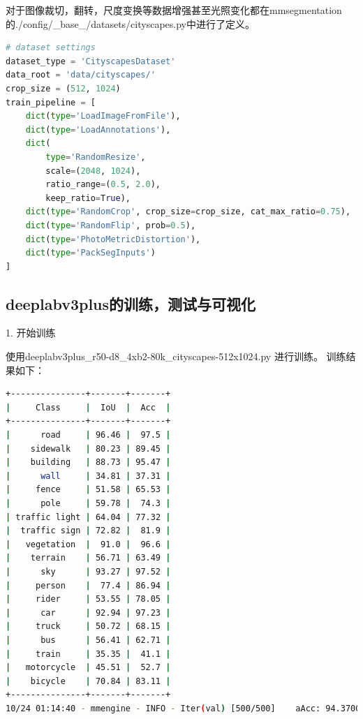 \documentclass[12pt]{ctexart}
\begin{document}
对于图像裁切，翻转，尺度变换等数据增强甚至光照变化都在mmsegmentation的./config/\_base\_/datasets/cityscapes.py中进行了定义。
\begin{lstlisting}[language=Python]
# dataset settings
dataset_type = 'CityscapesDataset'
data_root = 'data/cityscapes/'
crop_size = (512, 1024)
train_pipeline = [
    dict(type='LoadImageFromFile'),
    dict(type='LoadAnnotations'),
    dict(
        type='RandomResize',
        scale=(2048, 1024),
        ratio_range=(0.5, 2.0),
        keep_ratio=True),
    dict(type='RandomCrop', crop_size=crop_size, cat_max_ratio=0.75),
    dict(type='RandomFlip', prob=0.5),
    dict(type='PhotoMetricDistortion'),
    dict(type='PackSegInputs')
]
\end{lstlisting}


\subsection{deeplabv3plus的训练，测试与可视化}
1. 开始训练

使用deeplabv3plus\_r50-d8\_4xb2-80k\_cityscapes-512x1024.py
进行训练。
训练结果如下：
\begin{lstlisting}[language=bash]
+---------------+-------+-------+
|     Class     |  IoU  |  Acc  |
+---------------+-------+-------+
|      road     | 96.46 |  97.5 |
|    sidewalk   | 80.23 | 89.45 |
|    building   | 88.73 | 95.47 |
|      wall     | 34.81 | 37.31 |
|     fence     | 51.58 | 65.53 |
|      pole     | 59.78 |  74.3 |
| traffic light | 64.04 | 77.32 |
|  traffic sign | 72.82 |  81.9 |
|   vegetation  |  91.0 |  96.6 |
|    terrain    | 56.71 | 63.49 |
|      sky      | 93.27 | 97.52 |
|     person    |  77.4 | 86.94 |
|     rider     | 53.55 | 78.05 |
|      car      | 92.94 | 97.23 |
|     truck     | 50.72 | 68.15 |
|      bus      | 56.41 | 62.71 |
|     train     | 35.35 |  41.1 |
|   motorcycle  | 45.51 |  52.7 |
|    bicycle    | 70.84 | 83.11 |
+---------------+-------+-------+
10/24 01:14:40 - mmengine - INFO - Iter(val) [500/500]    aAcc: 94.3700  mIoU: 66.9600  mAcc: 76.1200  data_time: 0.0099  time: 0.1673
\end{lstlisting}
\end{document}
